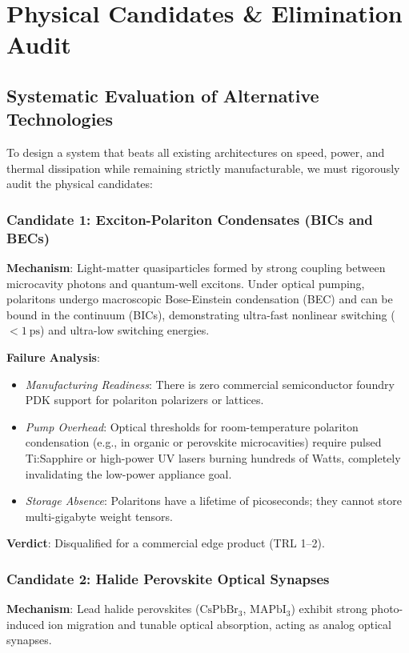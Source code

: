 \documentclass[11pt,a4paper]{report}
\begin{document}
\chapter{Physical Candidates \& Elimination Audit}

\section{Systematic Evaluation of Alternative Technologies}
To design a system that beats all existing architectures on speed, power, and thermal dissipation while remaining strictly manufacturable, we must rigorously audit the physical candidates:

\subsection{Candidate 1: Exciton-Polariton Condensates (BICs and BECs)}
\textbf{Mechanism}: Light-matter quasiparticles formed by strong coupling between microcavity photons and quantum-well excitons. Under optical pumping, polaritons undergo macroscopic Bose-Einstein condensation (BEC) and can be bound in the continuum (BICs), demonstrating ultra-fast nonlinear switching ($<1~\text{ps}$) and ultra-low switching energies.

\textbf{Failure Analysis}:
\begin{itemize}
\item \emph{Manufacturing Readiness}: There is zero commercial semiconductor foundry PDK support for polariton polarizers or lattices.
\item \emph{Pump Overhead}: Optical thresholds for room-temperature polariton condensation (e.g., in organic or perovskite microcavities) require pulsed Ti:Sapphire or high-power UV lasers burning hundreds of Watts, completely invalidating the low-power appliance goal.
\item \emph{Storage Absence}: Polaritons have a lifetime of picoseconds; they cannot store multi-gigabyte weight tensors.
\end{itemize}
\textbf{Verdict}: Disqualified for a commercial edge product (TRL 1--2).

\subsection{Candidate 2: Halide Perovskite Optical Synapses}
\textbf{Mechanism}: Lead halide perovskites ($\text{CsPbBr}_3$, $\text{MAPbI}_3$) exhibit strong photo-induced ion migration and tunable optical absorption, acting as analog optical synapses.
\end{document}

